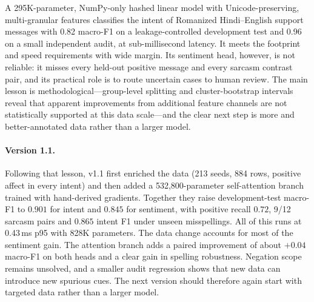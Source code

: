 \documentclass[11pt,a4paper]{article}
\theoremstyle{remark}
\begin{document}
A 295K-parameter, NumPy-only hashed linear model with Unicode-preserving,
multi-granular features classifies the intent of Romanized Hindi--English
support messages with 0.82 macro-F1 on a leakage-controlled development test
and 0.96 on a small independent audit, at sub-millisecond latency. It meets
the footprint and speed requirements with wide margin. Its sentiment head,
however, is not reliable: it misses every held-out positive message and every
sarcasm contrast pair, and its practical role is to route uncertain cases to
human review. The main lesson is methodological---group-level splitting and
cluster-bootstrap intervals reveal that apparent improvements from additional
feature channels are not statistically supported at this data scale---and the
clear next step is more and better-annotated data rather than a larger model.

\paragraph{Version 1.1.} Following that lesson, v1.1 first enriched the data
(213 seeds, 884 rows, positive affect in every intent) and then added a
532{,}800-parameter self-attention branch trained with hand-derived gradients.
Together they raise development-test macro-F1 to $0.901$ for intent and
$0.845$ for sentiment, with positive recall $0.72$, 9/12 sarcasm pairs and
$0.865$ intent F1 under unseen misspellings. All of this runs at 0.43\,ms p95
with 828K parameters. The data change accounts for most of the sentiment gain.
The attention branch adds a paired improvement of about $+0.04$ macro-F1 on
both heads and a clear gain in spelling robustness. Negation scope remains
unsolved, and a smaller audit regression shows that new data can introduce new
spurious cues. The next version should therefore again start with targeted
data rather than a larger model.
\end{document}
